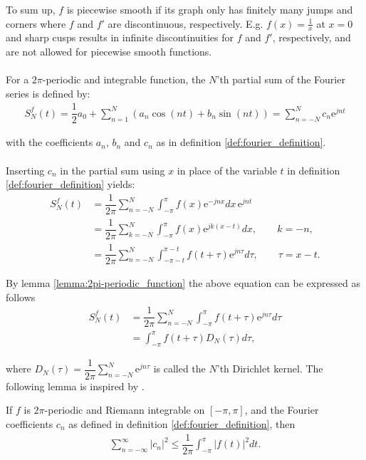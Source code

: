 To sum up, $f$ is piecewise smooth if its graph only has finitely many jumps and corners where $f$ and $f'$ are discontinuous, respectively. E.g. $f(x) = \frac{1}{x}$ at $x = 0$ and sharp cusps results in infinite discontinuities for $f$ and $f'$, respectively, and are not allowed for piecewise smooth functions.
\\ \\
For a $2\pi$-periodic and integrable function, the $N$'th partial sum of the Fourier series is defined by:
\begin{align}\label{eq:partialsumFourierSeries}
	S_N^f(t) = \dfrac{1}{2} a_0 + \sum_{n=1}^N\left(a_n \cos(n 		t) + b_n \sin(n t) \right) = \sum_{n=-N}^N c_n \text{e}^{j n t}
\end{align}

with the coefficients $a_n$, $b_n$ and $c_n$ as in definition \ref{def:fourier_definition}.
\\ \\
Inserting $c_n$ in the partial sum using $x$ in place of the variable $t$ in definition \ref{def:fourier_definition} yields:
\begin{align*}
	S_N^f(t)
	&= \dfrac{1}{2\pi}\sum_{n=-N}^N \int_{-\pi}^\pi f(x) 			\text{e}^{-j n x} dx\, \text{e}^{j n t} \\
	&= \dfrac{1}{2\pi}\sum_{k = -N}^N \int_{-\pi}^\pi f(x) 			\text{e}^{j k (x-t)} dx, \quad \quad k = -n, \\
	&= \dfrac{1}{2\pi} \sum_{n = -N}^N \int_{-\pi - t}^{\pi - 		t} f(t + \tau ) \text{e}^{j n \tau} d\tau, \quad \quad \tau 	= x-t.
\end{align*}

By lemma \ref{lemma:2pi-periodic_function} the above equation can be expressed as follows
\begin{align} \label{eq:dirichlet}
	S_N^f (t) 
	&= \dfrac{1}{2\pi} \sum_{n=-N}^N \int_{-\pi}^\pi f(t + 			\tau) \text{e}^{j n \tau} d\tau \nonumber \\
	&= \int_{-\pi}^\pi f(t + \tau) D_N(\tau) d\tau,
\end{align}

where $D_N(\tau) = \dfrac{1}{2\pi}\sum_{n=-N}^{N}\text{e}^{j n \tau}$ is called the $N$'th Dirichlet kernel. The following lemma is inspired by \cite{page 30, FAA}.

\begin{lemma} \label{lemma:Bessel1}
If $f$ is $2\pi$-periodic and Riemann integrable on $[-\pi,\pi]$, and the Fourier coefficients $c_n$ as defined in definition \ref{def:fourier_definition}, then
\begin{align*}
\sum_{n=-\infty}^\infty |c_n|^2 \leq \dfrac{1}{2\pi} \int_{-\pi}^\pi |f(t)|^2 dt.
\end{align*}
\end{lemma}

